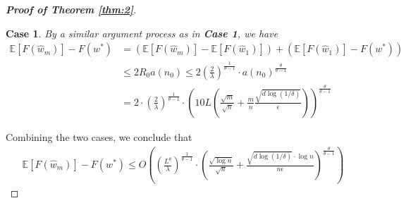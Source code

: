 \documentclass[12pt]{alt2022} %
\newtheorem{case}{Case}
\begin{document}
\begin{proof}[{\bf Proof of Theorem \ref{thm:2}}]
\begin{case}
By a similar argument process as in \textbf{Case 1}, we have 
	\begin{equation}
\begin{aligned}
\mathbb{E}[F(\hat{w}_m)]-F(w^{*})&=(\mathbb{E}[F(\hat{w}_m)]-\mathbb{E}[F(\hat{w}_1)])+(\mathbb{E}[F(\hat{w}_1)]-F(w^{*}))\\
&\leq 2R_0 a(n_0)\leq 2\left(\frac{2}{\lambda}\right)^{\frac{1}{\theta-1}}\cdot a(n_0)^{\frac{\theta}{\theta-1}}
\\&=2\cdot\left(\frac{2}{\lambda}\right)^{\frac{1}{\theta-1}}\cdot\left(10L\left(\frac{\sqrt{m}}{\sqrt{n}}+\frac{m}{n}\frac{\sqrt{d\log(1/\delta)}}{\epsilon}\right)\right)^{\frac{\theta}{\theta -1}}
\end{aligned}
\end{equation}
\end{case}
Combining the two cases, we conclude that 
	\begin{equation*}
\begin{aligned}
\mathbb{E}[F(\hat{w}_m)]-F(w^*)\leq O\left(\left(\frac{L^\theta}{\lambda}\right)^{\frac{1}{\theta-1}}\cdot\left(\frac{\sqrt{\log n}}{\sqrt{n}}+\frac{\sqrt{d\log(1/\delta)}\cdot\log n}{n\epsilon}\right)^{\frac{\theta}{\theta-1}}\right)
\end{aligned}
\end{equation*}

\end{proof}
\end{document}

